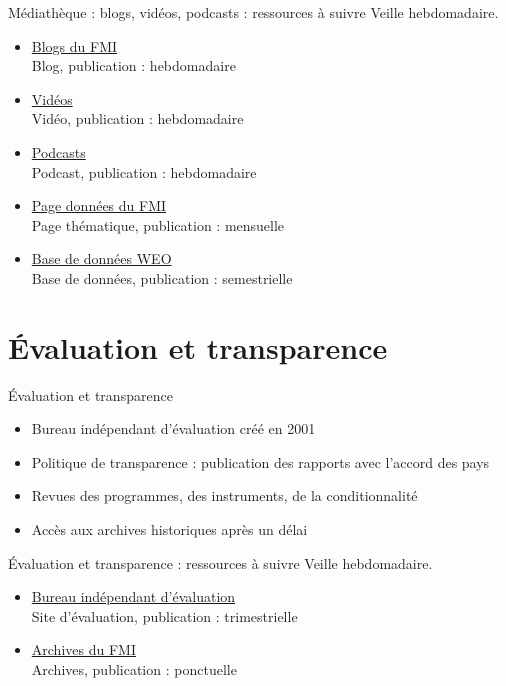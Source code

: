 \documentclass[aspectratio=169,11pt]{beamer}
\begin{document}
\begin{frame}{Médiathèque : blogs, vidéos, podcasts : ressources à suivre}
\small
Veille hebdomadaire.
\begin{itemize}
\item \href{https://www.imf.org/en/Blogs}{Blogs du FMI}\\{\footnotesize Blog, publication : hebdomadaire}
\item \href{https://www.imf.org/en/Videos}{Vidéos}\\{\footnotesize Vidéo, publication : hebdomadaire}
\item \href{https://www.imf.org/en/Podcasts}{Podcasts}\\{\footnotesize Podcast, publication : hebdomadaire}
\item \href{https://www.imf.org/en/Data}{Page données du FMI}\\{\footnotesize Page thématique, publication : mensuelle}
\item \href{https://www.imf.org/en/Publications/WEO/weo-database}{Base de données WEO}\\{\footnotesize Base de données, publication : semestrielle}
\end{itemize}
\end{frame}

\section{Évaluation et transparence}
\begin{frame}{Évaluation et transparence}
\begin{itemize}
\item Bureau indépendant d'évaluation créé en 2001
\item Politique de transparence : publication des rapports avec l'accord des pays
\item Revues des programmes, des instruments, de la conditionnalité
\item Accès aux archives historiques après un délai
\end{itemize}
\end{frame}

\begin{frame}{Évaluation et transparence : ressources à suivre}
\small
Veille hebdomadaire.
\begin{itemize}
\item \href{https://ieo.imf.org}{Bureau indépendant d'évaluation}\\{\footnotesize Site d'évaluation, publication : trimestrielle}
\item \href{https://www.imf.org/en/About/Archives}{Archives du FMI}\\{\footnotesize Archives, publication : ponctuelle}
\end{itemize}
\end{frame}
\end{document}
